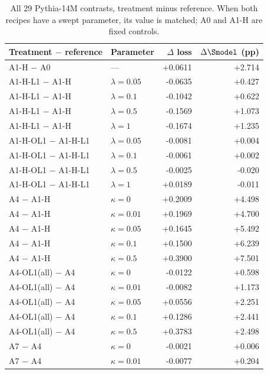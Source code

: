 \begin{table}[p]\centering\small\renewcommand{\arraystretch}{0.95}
\caption{All 29 Pythia-14M contrasts, treatment minus reference. When both recipes have a swept parameter, its value is matched; A0 and A1-H are fixed controls.}\label{tab:paired-effects-full}
\begin{tabular}{@{}llrr@{}}
\toprule
Treatment $-$ reference & Parameter & $\Delta$ loss & $\Delta\Smodel$ (pp) \\
\midrule
A1-H $-$ A0 & --- & +0.0611 & +2.714 \\
A1-H-L1 $-$ A1-H & $\lambda=0.05$ & -0.0635 & +0.427 \\
A1-H-L1 $-$ A1-H & $\lambda=0.1$ & -0.1042 & +0.622 \\
A1-H-L1 $-$ A1-H & $\lambda=0.5$ & -0.1569 & +1.073 \\
A1-H-L1 $-$ A1-H & $\lambda=1$ & -0.1674 & +1.235 \\
A1-H-OL1 $-$ A1-H-L1 & $\lambda=0.05$ & -0.0081 & +0.004 \\
A1-H-OL1 $-$ A1-H-L1 & $\lambda=0.1$ & -0.0061 & +0.002 \\
A1-H-OL1 $-$ A1-H-L1 & $\lambda=0.5$ & -0.0025 & -0.020 \\
A1-H-OL1 $-$ A1-H-L1 & $\lambda=1$ & +0.0189 & -0.011 \\
A4 $-$ A1-H & $\kappa=0$ & +0.2009 & +4.498 \\
A4 $-$ A1-H & $\kappa=0.01$ & +0.1969 & +4.700 \\
A4 $-$ A1-H & $\kappa=0.05$ & +0.1645 & +5.492 \\
A4 $-$ A1-H & $\kappa=0.1$ & +0.1500 & +6.239 \\
A4 $-$ A1-H & $\kappa=0.5$ & +0.3900 & +7.501 \\
A4-OL1(all) $-$ A4 & $\kappa=0$ & -0.0122 & +0.598 \\
A4-OL1(all) $-$ A4 & $\kappa=0.01$ & -0.0082 & +1.173 \\
A4-OL1(all) $-$ A4 & $\kappa=0.05$ & +0.0556 & +2.251 \\
A4-OL1(all) $-$ A4 & $\kappa=0.1$ & +0.1286 & +2.441 \\
A4-OL1(all) $-$ A4 & $\kappa=0.5$ & +0.3783 & +2.498 \\
A7 $-$ A4 & $\kappa=0$ & -0.0021 & +0.006 \\
A7 $-$ A4 & $\kappa=0.01$ & -0.0077 & +0.204 \\

\end{tabular}
\end{table}
